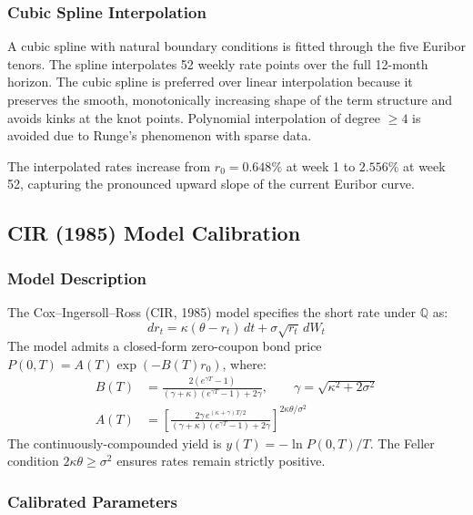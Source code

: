 \documentclass[12pt,a4paper]{article}
\begin{document}
\subsubsection{Cubic Spline Interpolation}

A cubic spline with natural boundary conditions is fitted through the five Euribor tenors. The spline interpolates 52 weekly rate points over the full 12-month horizon. The cubic spline is preferred over linear interpolation because it preserves the smooth, monotonically increasing shape of the term structure and avoids kinks at the knot points. Polynomial interpolation of degree $\geq 4$ is avoided due to Runge's phenomenon with sparse data.

The interpolated rates increase from $r_0 = 0.648\%$ at week 1 to $2.556\%$ at week 52, capturing the pronounced upward slope of the current Euribor curve.

\subsection{CIR (1985) Model Calibration}

\subsubsection{Model Description}

The Cox--Ingersoll--Ross (CIR, 1985) model specifies the short rate under $\mathbb{Q}$ as:
\[
  dr_t = \kappa(\theta - r_t)\,dt + \sigma\sqrt{r_t}\,dW_t
\]
The model admits a closed-form zero-coupon bond price $P(0,T) = A(T)\exp(-B(T)r_0)$, where:
\begin{align*}
  B(T) &= \frac{2(e^{\gamma T} - 1)}{(\gamma + \kappa)(e^{\gamma T} - 1) + 2\gamma}, \qquad \gamma = \sqrt{\kappa^2 + 2\sigma^2} \\
  A(T) &= \left[\frac{2\gamma\,e^{(\kappa+\gamma)T/2}}{(\gamma+\kappa)(e^{\gamma T}-1)+2\gamma}\right]^{2\kappa\theta/\sigma^2}
\end{align*}
The continuously-compounded yield is $y(T) = -\ln P(0,T)/T$. The Feller condition $2\kappa\theta \geq \sigma^2$ ensures rates remain strictly positive.

\subsubsection{Calibrated Parameters}
\end{document}

